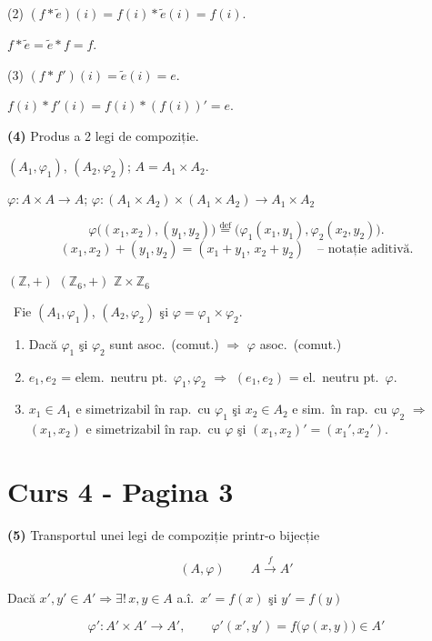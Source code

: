 \noindent (2) $(f*\tilde e)(i) = f(i)*\tilde e(i) = f(i)$.

\noindent $f*\tilde e = \tilde e*f = f$.

\noindent (3) $(f*f')(i) = \tilde e(i) = e$.

\noindent $f(i)*f'(i) = f(i)*(f(i))' = e$.

\bigskip
\noindent\textbf{(4)} Produs a 2 legi de compoziție.

\noindent $(A_1,\varphi_1)$, $(A_2,\varphi_2)$; $A = A_1\times A_2$.

\noindent $\varphi : A\times A \to A$; \quad $\varphi : (A_1\times A_2)\times(A_1\times A_2) \to A_1\times A_2$

\[
\varphi\big((x_1,x_2),(y_1,y_2)\big) \overset{\text{def}}{=} \big(\varphi_1(x_1,y_1),\varphi_2(x_2,y_2)\big).
\]
\[
(x_1,x_2)+(y_1,y_2) = (x_1+y_1,\,x_2+y_2) \quad \text{-- notație aditivă.}
\]

\noindent $(\mathbb{Z},+)$ \qquad $(\mathbb{Z}_6,+)$ \qquad $\mathbb{Z}\times\mathbb{Z}_6$

\bigskip
\noindent{} \ Fie $(A_1,\varphi_1)$, $(A_2,\varphi_2)$ şi $\varphi = \varphi_1\times\varphi_2$.

\begin{enumerate}
\item[(1)] Dacă $\varphi_1$ şi $\varphi_2$ sunt asoc.\ (comut.) $\Rightarrow$ $\varphi$ asoc.\ (comut.)
\item[(2)] $e_1,e_2$ = elem.\ neutru pt.\ $\varphi_1,\varphi_2$ $\Rightarrow$ $(e_1,e_2)$ = el.\ neutru pt.\ $\varphi$.
\item[(3)] $x_1\in A_1$ e simetrizabil în rap.\ cu $\varphi_1$ şi $x_2\in A_2$ e sim.\ în rap.\ cu $\varphi_2$ $\Rightarrow$ $(x_1,x_2)$ e simetrizabil în rap.\ cu $\varphi$ şi $(x_1,x_2)' = (x_1',x_2')$.
\end{enumerate}





\section*{Curs 4 - Pagina 3}
\noindent\textbf{(5)} Transportul unei legi de compoziție printr-o bijecție

\[
(A,\varphi) \qquad A \xrightarrow{f} A'
\]

\noindent Dacă $x',y'\in A' \Rightarrow \exists!\, x,y\in A$ a.î.\ $x'=f(x)$ şi $y'=f(y)$

\[
\varphi' : A'\times A' \to A', \qquad \varphi'(x',y') = f\big(\varphi(x,y)\big) \in A'
\]

